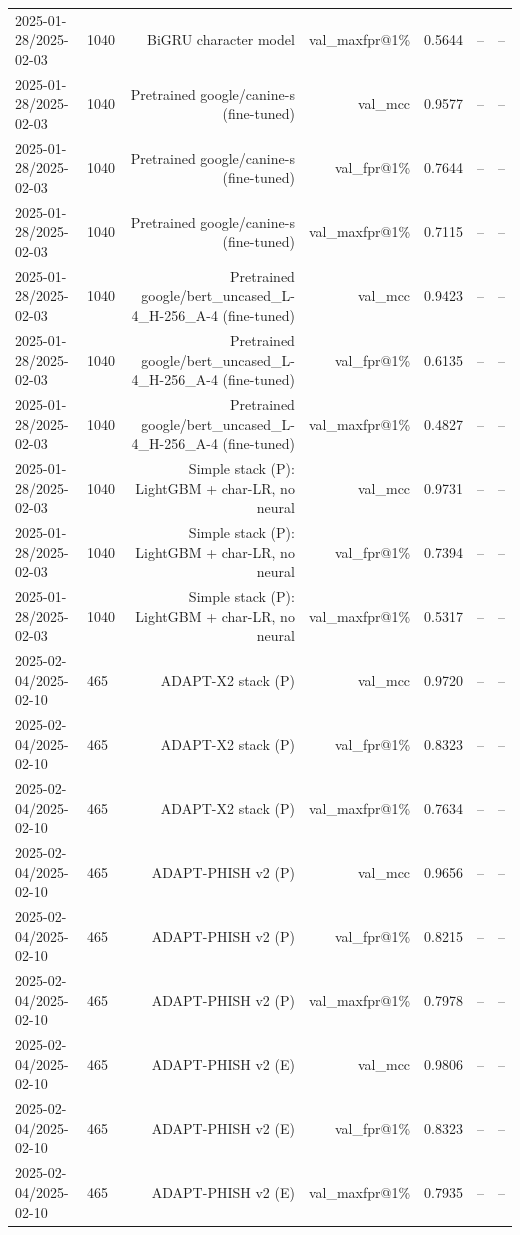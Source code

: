 \begin{table}[t]
\begin{tabular}{llrrrrr}
2025-01-28/2025-02-03 & 1040 & BiGRU character model & val\_maxfpr@1\% & 0.5644 & -- & -- \\
2025-01-28/2025-02-03 & 1040 & Pretrained google/canine-s (fine-tuned) & val\_mcc & 0.9577 & -- & -- \\
2025-01-28/2025-02-03 & 1040 & Pretrained google/canine-s (fine-tuned) & val\_fpr@1\% & 0.7644 & -- & -- \\
2025-01-28/2025-02-03 & 1040 & Pretrained google/canine-s (fine-tuned) & val\_maxfpr@1\% & 0.7115 & -- & -- \\
2025-01-28/2025-02-03 & 1040 & Pretrained google/bert\_uncased\_L-4\_H-256\_A-4 (fine-tuned) & val\_mcc & 0.9423 & -- & -- \\
2025-01-28/2025-02-03 & 1040 & Pretrained google/bert\_uncased\_L-4\_H-256\_A-4 (fine-tuned) & val\_fpr@1\% & 0.6135 & -- & -- \\
2025-01-28/2025-02-03 & 1040 & Pretrained google/bert\_uncased\_L-4\_H-256\_A-4 (fine-tuned) & val\_maxfpr@1\% & 0.4827 & -- & -- \\
2025-01-28/2025-02-03 & 1040 & Simple stack (P): LightGBM + char-LR, no neural & val\_mcc & 0.9731 & -- & -- \\
2025-01-28/2025-02-03 & 1040 & Simple stack (P): LightGBM + char-LR, no neural & val\_fpr@1\% & 0.7394 & -- & -- \\
2025-01-28/2025-02-03 & 1040 & Simple stack (P): LightGBM + char-LR, no neural & val\_maxfpr@1\% & 0.5317 & -- & -- \\
2025-02-04/2025-02-10 & 465 & ADAPT-X2 stack (P) & val\_mcc & 0.9720 & -- & -- \\
2025-02-04/2025-02-10 & 465 & ADAPT-X2 stack (P) & val\_fpr@1\% & 0.8323 & -- & -- \\
2025-02-04/2025-02-10 & 465 & ADAPT-X2 stack (P) & val\_maxfpr@1\% & 0.7634 & -- & -- \\
2025-02-04/2025-02-10 & 465 & ADAPT-PHISH v2 (P) & val\_mcc & 0.9656 & -- & -- \\
2025-02-04/2025-02-10 & 465 & ADAPT-PHISH v2 (P) & val\_fpr@1\% & 0.8215 & -- & -- \\
2025-02-04/2025-02-10 & 465 & ADAPT-PHISH v2 (P) & val\_maxfpr@1\% & 0.7978 & -- & -- \\
2025-02-04/2025-02-10 & 465 & ADAPT-PHISH v2 (E) & val\_mcc & 0.9806 & -- & -- \\
2025-02-04/2025-02-10 & 465 & ADAPT-PHISH v2 (E) & val\_fpr@1\% & 0.8323 & -- & -- \\
2025-02-04/2025-02-10 & 465 & ADAPT-PHISH v2 (E) & val\_maxfpr@1\% & 0.7935 & -- & -- \\

\end{tabular}
\end{table}
